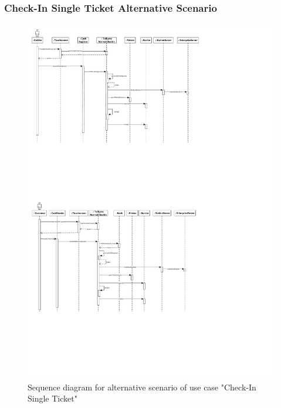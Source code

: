 \subsubsection{Check-In Single Ticket Alternative Scenario}

\begin{figure}
\centerline{\includegraphics[width=\textwidth]{"img/sequence_diagrams/SequenceDiagram_CheckInSingleTicket_card"}}
\caption{Sequence diagram for alternative scenario of use case "Check-In Single Ticket"}
\label{fig:seq_single_ticket_alt}
\end{figure}

